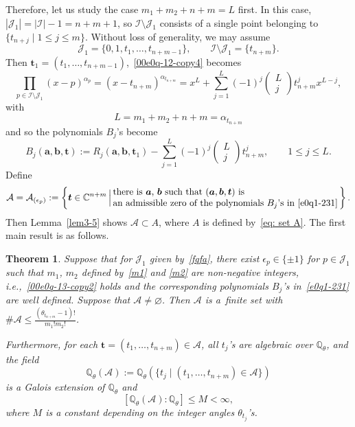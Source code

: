 \documentclass[10pt,a4paper]{amsart}
\numberwithin{equation}{section}
\newtheorem{Theorem}{Theorem}[section]
\def\C{\mathbb C}
\def\Q{\mathbb Q}
\begin{document}
Therefore, let us study the case $m_1+m_2+n+m=L$ first. In this case,
$|\mathcal{J}_1|= |\mathcal{I}|-1=n+m+1$, so
$\mathcal{I}\setminus\mathcal{J}_1$ consists of a single point
belonging to $\{t_{n+j}\mid 1\leq j\leq m\}$. Without loss of
generality, we may assume
\begin{equation}\label{fqfa}
 \mathcal{J}_1=\{0,1,t_1,\dots, t_{n+m-1}\},\qquad
 \mathcal{I}\setminus\mathcal{J}_1=\{t_{n+m}\}.
\end{equation}
Then $\boldsymbol t_1=(t_1,\dots, t_{n+m-1})$,~\eqref{00e0q-12-copy4} becomes
\begin{equation*}%
\prod_{p\in \mathcal{I}\setminus\mathcal{J}_1} (x-p)^{\alpha_{p}}=(x-t_{n+m})^{{\alpha}_{t_{n+m}}}=x^{L}
+\sum_{j=1}^{L}(-1)^j
\begin{pmatrix}L\\ j\end{pmatrix}t_{n+m}^jx^{L-j},
\end{equation*}
with
\begin{equation}\label{00e0q-13-copy2}L=m_1+m_2+n+m={\alpha}_{t_{n+m}}\end{equation} and so the polynomials $B_j$'s become
\begin{equation}
\label{e0q1-231}
B_j(\boldsymbol a,\boldsymbol b,\boldsymbol t):=R_j(\boldsymbol a,\boldsymbol b,\boldsymbol t_1)-\sum_{j=1}^{L}(-1)^j
\begin{pmatrix}L\\ j\end{pmatrix}t_{n+m}^j,\qquad 1\leq j\leq L.
\end{equation}
Define
\[\mathcal{A}=\mathcal{A}_{(\epsilon_p)}:=\left\{\boldsymbol {t}\in\C^{n+m}\,\Big|\,\begin{array}{@{}lll@{}}\text{there is $\boldsymbol a$, $\boldsymbol b$ such that $(\boldsymbol a,\boldsymbol b,\boldsymbol t)$ is}\\ \text{an admissible zero of the polynomials $B_j$'s in~\eqref{e0q1-231}}\end{array}\!\!\right\}.
\]
Then Lemma~\ref{lem3-5} shows $\mathcal{A}\subset A$, where $A$ is
defined by~\eqref{eq: set A}.
The first main result is as follows.

\begin{Theorem}\label{thm-J1}
Suppose that for $\mathcal{J}_1$ given by~\eqref{fqfa}, there exist
$\epsilon_p\in \{\pm 1\}$ for $p\in\mathcal{J}_1$ such that $m_1$, $m_2$
defined by~\eqref{m1} and \eqref{m2} are non-negative integers,
i.e.,~\eqref{00e0q-13-copy2} holds and the corresponding polynomials
$B_j$'s in~\eqref{e0q1-231} are well defined.
Suppose that $\mathcal{A}\neq \varnothing$. Then $\mathcal{A}$ is a~finite set with $\#\mathcal{A}\leq
\frac{(\theta_{t_{n+m}}-1)!}{m_1!m_2!}$.

Furthermore, for each $\boldsymbol t=(t_1,\dots,t_{n+m})\in
\mathcal{A}$, all $t_j$'s are algebraic over $\Q_{\theta}$, and the
field
\[
 \Q_\theta(\mathcal{A}):=\Q_{\theta}(\{t_j \mid (t_1,\dots,t_{n+m})\in
 \mathcal{A}\})
\]
is a Galois extension of $\Q_{\theta}$ and
\[[\Q_\theta(\mathcal{A}) :\Q_\theta]\leq M<\infty,\]
where $M$ is a constant depending on the integer angles
$\theta_{t_{j}}$'s.
\end{Theorem}
\end{document}
